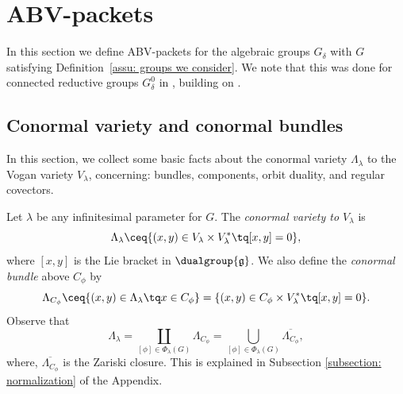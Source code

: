 \documentclass[11pt,letterpaper]{amsart}
\numberwithin{equation}{section}
\begin{document}
\section{ABV-packets}
\label{section: ABV-packets}

In this section we define ABV-packets for the algebraic groups $G_\delta$ {with $G$} satisfying Definition~\ref{assu: groups we consider}. We note that this was done for connected reductive groups $G_\delta^0$ in \cite{CFMMX22}, building on \cite{Vog93}.



\subsection{Conormal variety and conormal bundles}\label{subsection: conormal}

In this section, we collect some basic facts about the conormal variety $\Lambda_\lambda$ to the Vogan variety $V_\lambda$, concerning: bundles, components, orbit duality, and regular covectors.



Let $\lambda$ be any infinitesimal parameter for $G$.
The {\it conormal variety to $V_\lambda$}
 is 
\begin{equation}\label{definiition: conormal}
\Lambda_\lambda 
\ceq
\{ (x,y)\in V_\lambda\times V_{\lambda}^* \tq [x,y]=0 \},
\end{equation}
where $[x,y]$ is the Lie bracket in $\dualgroup{\mathfrak{g}}$.
We also define the {\it conormal bundle} above $C_\phi$ by
\[
\Lambda_{C_\phi} 
\ceq
\{ (x,y)\in \Lambda_{\lambda} \tq x\in C_\phi \}
=
\{ (x,y)\in C_\phi \times V_{\lambda}^* \tq [x,y] =0 \}.
\] 
Observe that
\[
\Lambda_\lambda 
= 
\coprod_{[\phi]\in \Phi_\lambda(G)}
\Lambda_{C_\phi}
=
\bigcup_{[\phi]\in \Phi_\lambda(G)}
\overline{\Lambda_{C_\phi}},
\] where, $\overline{\Lambda_{C_\phi}}$ is the Zariski closure.
This is explained in Subsection \ref{subsection: normalization} of the Appendix.
\end{document}
